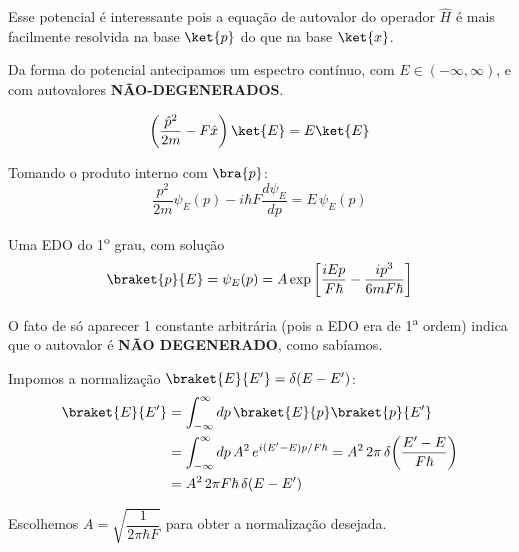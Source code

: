 Esse potencial é interessante pois a equação de autovalor do operador $\hat{H}$ é mais facilmente resolvida na base $\ket{p}$ do que na base $\ket{x}$.

Da forma do potencial antecipamos um espectro contínuo, com $E \in (-\infty, \infty)$, e com autovalores \textbf{NÃO-DEGENERADOS}.

\begin{center}
\end{center}

\begin{equation}
    \left( \frac{\hat{p}^2}{2m} - F\hat{x} \right) \ket{E} = E \ket{E}
\label{eq:aula17_autovalor_H}
\end{equation}

Tomando o produto interno com $\bra{p}$:
\begin{equation}
    \frac{p^2}{2m}\psi_E(p) - i\hbar F \frac{d\psi_E}{dp} = E\, \psi_E(p)
\label{eq:aula17_edo_p}
\end{equation}

Uma EDO do 1\textsuperscript{o} grau, com solução
\begin{equation}
    \braket{p}{E} = \psi_E(p) = A \exp\left[ \frac{iEp}{F\hbar} - \frac{ip^3}{6mF\hbar} \right]
\label{eq:aula17_psiE_sem_norm}
\end{equation}

O fato de só aparecer 1 constante arbitrária (pois a EDO era de 1\textsuperscript{a} ordem) indica que o autovalor é \textbf{NÃO DEGENERADO}, como sabíamos.

Impomos a normalização $\braket{E}{E'} = \delta(E - E')$:
\begin{align}
    \braket{E}{E'} &= \int_{-\infty}^{\infty} dp\, \braket{E}{p}\braket{p}{E'} \notag \\
    &= \int_{-\infty}^{\infty} dp\, A^2\, e^{i(E'-E)p/F\hbar} = A^2\, 2\pi\, \delta\!\left( \frac{E'-E}{F\hbar} \right) \notag \\
    &= A^2\, 2\pi F\hbar\, \delta(E-E')
\label{eq:aula17_normalizacao}
\end{align}

Escolhemos $A = \sqrt{\dfrac{1}{2\pi\hbar F}}$ para obter a normalização desejada.

